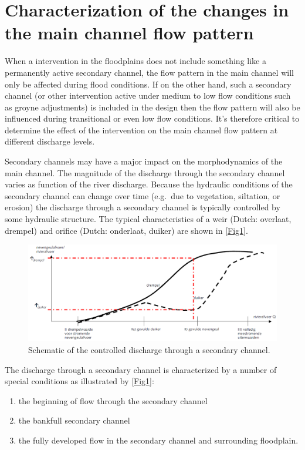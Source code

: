 \section{Characterization of the changes in the main channel flow pattern}

When a intervention in the floodplains does not include something like a permanently active secondary channel, the flow pattern in the main channel will only be affected during flood conditions.
If on the other hand, such a secondary channel (or other intervention active under medium to low flow conditions such as groyne adjustments) is included in the design then the flow pattern will also be influenced during transitional or even low flow conditions.
It's therefore critical to determine the effect of the intervention on the main channel flow pattern at different discharge levels.

Secondary channels may have a major impact on the morphodynamics of the main channel.
The magnitude of the discharge through the secondary channel varies as function of the river discharge.
Because the hydraulic conditions of the secondary channel can change over time (e.g.~due to vegetation, siltation, or erosion) the discharge through a secondary channel is typically controlled by some hydraulic structure.
The typical characteristics of a weir (Dutch: overlaat, drempel) and orifice (Dutch: onderlaat, duiker) are shown in \autoref{Fig1}.

\begin{figure}[b]
\includegraphics[width=\columnwidth]{figures/Fig1.png}
\caption{Schematic of the controlled discharge through a secondary channel.}
\label{Fig1}
\end{figure}

The discharge through a secondary channel is characterized by a number of special conditions as illustrated by \autoref{Fig1}:

\begin{enumerate}
\item the beginning of flow through the secondary channel
\item the bankfull secondary channel
\item the fully developed flow in the secondary channel and surrounding floodplain.
\end{enumerate}

